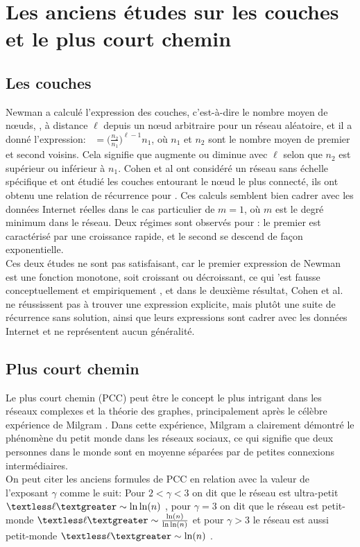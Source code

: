 \section{Les anciens études sur les couches et le plus court chemin}
\subsection{Les couches}
Newman \cite{Newman2010-456} a calculé l'expression des couches, c'est-à-dire le nombre moyen de nœuds, \nl, à distance $\ell$ depuis un nœud arbitraire pour un réseau aléatoire, et il a donné l'expression: ~\nl$=\Big(\frac{n_2}{n_1}\Big)^{\ell-1}n_1$, où $n_1$ et $n_2$ sont le nombre moyen de premier et second voisins. Cela signifie que \nl augmente ou diminue avec $\ell$ selon que $n_2$ est supérieur ou inférieur à $n_1$. Cohen et al \cite{Cohen-Havlinl2010-72,Kalisky-al2006} ont considéré un réseau sans échelle spécifique et ont étudié les couches entourant le nœud le plus connecté, ils ont obtenu une relation de récurrence pour \nl. Ces calculs semblent bien cadrer avec les données Internet réelles dans le cas particulier de $m=1$, où $m$ est le degré minimum dans le réseau. Deux régimes sont observés pour \nl: le premier est caractérisé par une croissance rapide, et le second se descend de façon exponentielle.\\
Ces deux études ne sont pas satisfaisant, car le premier expression de Newman est une fonction monotone, soit croissant ou décroissant, ce qui 'est fausse conceptuellement et  empiriquement \cite{Cohen-Havlinl2010}, et dans le deuxième résultat, Cohen et al.  ne réussissent pas à trouver une expression explicite, mais plutôt une suite de récurrence sans solution, ainsi que leurs expressions sont cadrer avec les données Internet et ne représentent aucun généralité.
 
\subsection{Plus court chemin}
\label{PCC}
 Le plus court chemin (PCC) peut être le concept le plus intrigant dans les réseaux complexes et la théorie des graphes, principalement après le célèbre expérience de Milgram \cite{Mi1967}. Dans cette expérience, Milgram a clairement démontré le phénomène du petit monde dans les réseaux sociaux, ce qui signifie que deux personnes dans le monde sont en moyenne séparées par de petites connexions intermédiaires.\\
 On peut citer les anciens formules de PCC  en relation avec la valeur de l'exposant $\gamma$ comme le suit: Pour $2<\gamma<3$ on dit que le réseau est ultra-petit $\textless\ell\textgreater\sim \ln\ln(n)$ \cite{Cohen-Havlin2003,Do-al2003,Cohen-al2002,Chung-Lu2002,Fox-Bellwood2014,Hofstad-al2014}, pour $\gamma=3$ on dit que le réseau est petit-monde $\textless\ell\textgreater\sim\frac{\ln(n)}{\ln\ln(n)}$ \cite{Bollobas1985,Chung-Lu2002,Fronczak-al2004,Hofstad-al2004,Cohen-Havlin2009} et pour $\gamma>3$ le réseau est aussi petit-monde $\textless\ell\textgreater\sim\ln(n)$ \cite{Bollobas1985,Chung-Lu2002,Fronczak-al2004,Hofstad-al2004,Cohen-Havlin2009}.  

